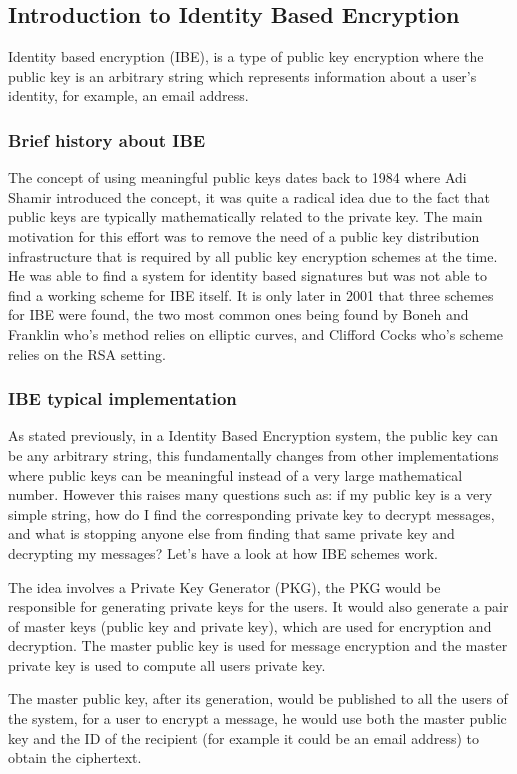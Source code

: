 \documentclass[conference]{IEEEtran}
\begin{document}
\subsection{Introduction to Identity Based Encryption}
Identity based encryption (IBE), is a type of public key encryption 
where the public key is an arbitrary string which represents information
about a user's identity, for example, an email address. 
\subsubsection{Brief history about IBE}
The concept of using meaningful public keys dates back to 1984 where Adi Shamir
introduced the concept, it was quite a radical idea due to the fact that 
public keys are typically mathematically related to the private key. The main 
motivation for this effort was to remove the need of a public key distribution
infrastructure that is required by all public key encryption schemes at the time.
He was able to find a system for identity based signatures but was not able to 
find a working scheme for IBE itself. It is only later in 
2001 that three schemes for IBE were found, the two most common ones being 
found by Boneh and Franklin who's method relies on elliptic curves, and 
Clifford Cocks who's scheme relies on the RSA setting.

\subsubsection{IBE typical implementation}
As stated previously, in a Identity Based Encryption system, 
the public key can be any arbitrary string, this fundamentally changes
from other implementations where public keys can be meaningful instead of 
a very large mathematical number. However this raises many questions such as: 
if my public key is a very simple string, how do I find the corresponding private
key to decrypt messages, and what is stopping anyone else from finding that same 
private key and decrypting my messages? Let's have a look at how IBE schemes work.


The idea involves a Private Key Generator (PKG), the PKG would be responsible 
for generating private keys for the users. It would also generate a pair of 
master keys (public key and private key), which are used for 
encryption and decryption. The master public key is used for message encryption and the master
private key is used to compute all users private key.


The master public key, after its generation, would be published to all the users of the system, for a user 
to encrypt a message, he would use both the master public key and the ID of the recipient
(for example it could be an email address) to obtain the ciphertext.
\end{document}
